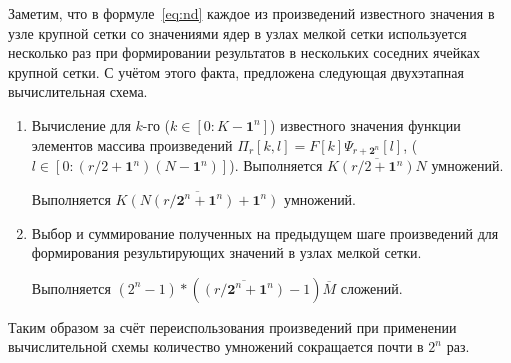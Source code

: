 
  



Заметим, 
что в формуле~\eqref{eq:nd} каждое из произведений известного значения в узле крупной сетки
со значениями ядер в узлах мелкой сетки используется несколько раз
при формировании результатов в нескольких соседних
ячейках 
крупной сетки. 
С учётом этого факта,
предложена следующая двухэтапная вычислительная схема.
\begin{enumerate}
\item
  Вычисление для $k$-го ($k \in [0:K-\mathbf{1}^n]$)
  известного значения функции 
  элементов массива произведений
  $\Pi_r[k,l] = F[k]\Psi_{r+\mathbf{2}^n}[l]$,
($l \in [0:(r/2+\mathbf{1}^n)(N-\mathbf{1}^n)]$).
  Выполняется %
  $\overline{K(r/2+\mathbf{1}^n)N}$ умножений.

  Выполняется $\overline{K (N(r/\mathbf{2}^n + \mathbf{1}^n) +\mathbf{1}^n)}$ умножений.

\item
  Выбор и суммирование полученных на предыдущем шаге произведений
  для формирования результирующих значений в узлах мелкой сетки.
  

  Выполняется $(2^n-1) * (\overline{(r/\mathbf{2}^n+\mathbf{1}^n)} -1)  \overline{M}$ сложений.

\end{enumerate}

Таким образом за счёт переиспользования произведений при применении вычислительной схемы
количество умножений сокращается почти в  $2^n$ раз.


